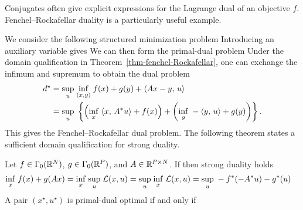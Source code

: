 
Conjugates often give explicit expressions for the Lagrange dual of an objective $f$. Fenchel--Rockafellar duality is a particularly useful example.

We consider the following structured minimization problem
Introducing an auxiliary variable gives
We can then form the primal-dual problem
Under the domain qualification in Theorem~\ref{thm-fenchel-Rockafellar}, one can exchange the infimum and supremum to obtain the dual problem
\begin{align}\label{eq-deriv-rock-fench}
	d^\star &= \underset{u}{\sup}\; \underset{(x,y)}{\inf}\; f(x) + g(y) + \langle Ax-y,\,u\rangle \\
	&= \underset{u}{\sup}\; \left\{\left(  \underset{x}{\inf}\; \langle x,\,A^* u\rangle + f(x)  \right) + \left(  \underset{y}{\inf}\; -\langle y,\,u\rangle + g(y)  \right)\right\}.
\end{align}
This gives the Fenchel--Rockafellar dual problem. The following theorem states a sufficient domain qualification for strong duality.

\begin{thm}\label{thm-fenchel-Rockafellar}
Let $f\in\Gamma_0(\mathbb{R}^N)$, $g\in\Gamma_0(\mathbb{R}^P)$, and $A\in\mathbb{R}^{P\times N}$. If
then strong duality holds
\begin{align}\label{eq-fenchel-Rockafellar}
	\underset{x}{\inf}\; f(x) + g(Ax) &= \underset{x}{\inf}\; \underset{u}{\sup}\; \mathcal{L}(x,u) 
	= \underset{u}{\sup}\; \underset{x}{\inf}\;\mathcal{L}(x,u)  
	= \underset{u}{\sup}\; - f^*(-A^*u) - g^*(u)
\end{align}
A pair $(x^\star,u^\star)$ is primal-dual optimal if and only if
\end{thm}

